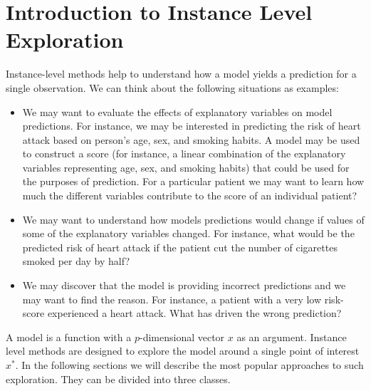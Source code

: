 \documentclass[12pt,]{krantz}
\providecommand{\tightlist}{%
  \setlength{\itemsep}{0pt}\setlength{\parskip}{0pt}}
\begin{document}
\hypertarget{InstanceLevelExploration}{%
\section{Introduction to Instance Level Exploration}\label{InstanceLevelExploration}}

Instance-level methods help to understand how a model yields a prediction for a single observation. We can think about the following situations as examples:

\begin{itemize}
\tightlist
\item
  We may want to evaluate the effects of explanatory variables on model predictions. For instance, we may be interested in predicting the risk of heart attack based on person's age, sex, and smoking habits. A model may be used to construct a score (for instance, a linear combination of the explanatory variables representing age, sex, and smoking habits) that could be used for the purposes of prediction. For a particular patient we may want to learn how much the different variables contribute to the score of an individual patient?
\item
  We may want to understand how models predictions would change if values of some of the explanatory variables changed. For instance, what would be the predicted risk of heart attack if the patient cut the number of cigarettes smoked per day by half?
\item
  We may discover that the model is providing incorrect predictions and we may want to find the reason. For instance, a patient with a very low risk-score experienced a heart attack. What has driven the wrong prediction?
\end{itemize}

A model is a function with a \(p\)-dimensional vector \(x\) as an argument. Instance level methods are designed to explore the model around a single point of interest \(x^*\). In the following sections we will describe the most popular approaches to such exploration. They can be divided into three classes.
\end{document}
